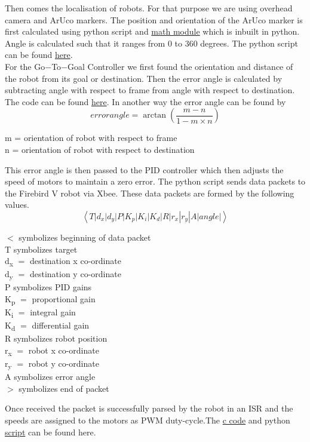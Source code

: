 \documentclass[a4paper,12pt,oneside]{book}
\begin{document}
Then comes the localisation of robots. For that purpose we are using overhead camera and ArUco markers. The position and orientation of the ArUco marker is first calculated using python script and \href{https://docs.python.org/2/library/math.html}{math module} which is inbuilt in python. Angle is calculated such that it ranges from 0 to 360 degrees. The python script can be found \href{https://github.com/eYSIP-2018/Jigsaw_Puzzle_Solver_using_Multiple_Robots/blob/master/Scripts/Aruco_pose.py}{here}.\\
For the Go$-$To$-$Goal Controller we first found the orientation and distance of the robot from its goal or destination. Then the error angle is calculated by subtracting angle with respect to frame from angle with respect to destination. The code can be found \href{https://github.com/eYSIP-2018/Jigsaw_Puzzle_Solver_using_Multiple_Robots/blob/master/Scripts/Aruco_pose_with_other_point.py}{here}. In another way the error angle can be found by\\
\begin{equation}
error angle = \arctan \left (\frac{m - n}{1 - m\times n}\right)
\end{equation}
\begin{center}
m = orientation of robot with respect to frame\\
\hspace{2.7 em}n = orientation of robot with respect to destination\end{center}
This error angle is then passed to the PID controller which then adjusts the speed of motors to maintain a zero error. The python script sends data packets to the Firebird V robot via Xbee. These data packets are formed by the following values.
\begin{equation}
\left\langle T|d_x|d_y|P|K_p|K_i|K_d|R|r_x|r_y|A|angle |\right\rangle
\end{equation}
\begin{center}
$<$ symbolizes beginning of data packet\\
T symbolizes target\\
d\textsubscript{x} $=$ destination x co-ordinate\\
d\textsubscript{y} $=$ destination y co-ordinate\\
P symbolizes PID gains\\
K\textsubscript{p} $=$ proportional gain\\
K\textsubscript{i} $=$ integral gain\\
K\textsubscript{d} $=$ differential gain\\
R symbolizes robot position\\
r\textsubscript{x} $=$ robot x co-ordinate\\
r\textsubscript{y} $=$ robot y co-ordinate\\
A symbolizes error angle\\
$>$ symbolizes end of packet\end{center}
Once received the packet is successfully parsed by the robot in an ISR and the speeds are assigned to the motors as PWM duty-cycle.The \href{}{c code} and python \href{}{script} can be found here. 
\end{document}
